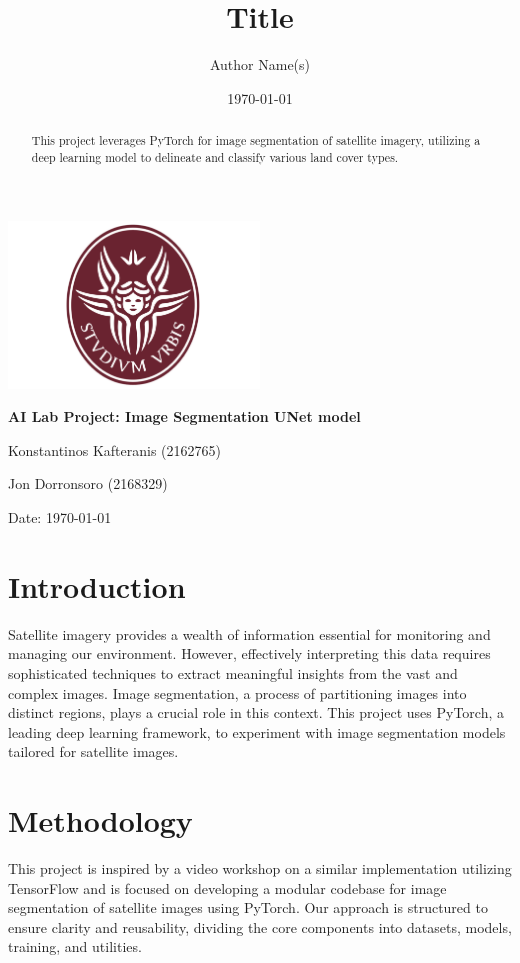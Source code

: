 \documentclass{article}
\title{Title}
\author{Author Name(s)}
\date{\today}
\begin{document}
\begin{titlepage}
    \centering
    \includegraphics[width=0.5\textwidth]{../assets/sapienza_logo.png} 
    \vfill
    {\bfseries\Large
        AI Lab Project: Image Segmentation UNet model\par
    }
    \vfill
    {\Large
        Konstantinos Kafteranis (2162765)\par Jon Dorronsoro (2168329)\par
    }
    \vfill
    {\large
        Date: \today\par
    }
\end{titlepage}

\begin{abstract}
    This project leverages PyTorch for image segmentation of satellite imagery, utilizing a deep learning model to delineate and classify various land cover types.
\end{abstract}

\section{Introduction}
Satellite imagery provides a wealth of information essential for monitoring and managing our environment. However, effectively interpreting this data requires sophisticated techniques to extract meaningful insights from the vast and complex images. Image segmentation, a process of partitioning images into distinct regions, plays a crucial role in this context. This project uses PyTorch, a leading deep learning framework, to experiment with image segmentation models tailored for satellite images.

\section{Methodology}
This project is inspired by a video workshop on a similar implementation utilizing TensorFlow and is focused on developing a modular codebase for image segmentation of satellite images using PyTorch. Our approach is structured to ensure clarity and reusability, dividing the core components into datasets, models, training, and utilities.
\end{document}
